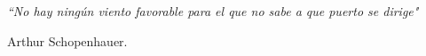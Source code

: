 \cleardoublepage %




\chapter*{}
\setlength{\leftmargin}{0.5\textwidth}
\setlength{\parsep}{0cm}
\addtolength{\topsep}{0.5cm}
\begin{flushright}
	\small\em{
		``No hay ningún viento favorable para el que no sabe a que puerto se dirige"
	}
\end{flushright}
\begin{flushright}
	\small{
		Arthur Schopenhauer.
	}
\end{flushright}
\cleardoublepage %
